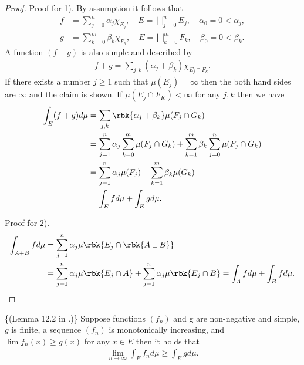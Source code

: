 \documentclass[openany, a4paper, oneside]{jsbook}
\begin{document}
\begin{proof}
Proof for 1).
By assumption it follows that
\begin{align}
  f
  &=
  \sum_{j=0}^n \alpha_j \chi_{E_j}, \quad
  E
  =
  \bigsqcup_{j=0}^{n} E_j, \quad
  \alpha_0 = 0 < \alpha_j, \\
  g
  &=
  \sum_{k=0}^m \beta_k \chi_{F_k}, \quad
  E
  =
  \bigsqcup_{k=0}^{m} F_k, \quad
  \beta_0 = 0 < \beta_k.
\end{align}
A function $(f+g)$ is also simple and described by
\begin{align}
  f + g
  =
  \sum_{j,k} (\alpha_j + \beta_k) \chi_{E_j \cap F_k}.
\end{align}
If there exists a number $j \geq 1$ such that $\mu (E_j) = \infty$ then
the both hand sides are $\infty$ and the claim is shown.
If $\mu (E_j \cap F_K) < \infty$ for any $j,k$ then we have
\begin{align}
 \int_E (f+g) d\mu
 &=
 \sum_{j,k} \rbk{\alpha_j + \beta_k} \mu (F_j \cap G_k) \\
 &=
 \sum_{j=1}^n \alpha_j \sum_{k=0}^m \mu (F_j \cap G_k) + \sum_{k=1}^m \beta_k \sum_{j=0}^n \mu (F_j \cap G_k) \\
 &=
 \sum_{j=1}^n \alpha_j \mu (F_j) + \sum_{k=1}^m \beta_k \mu (G_k) \\
 &=
 \int_E f d\mu + \int_E g d\mu.
\end{align}

Proof for 2).
\begin{align}
 \int_{A+B} f d \mu
 &=
 \sum_{j=1}^n \alpha_j \mu \rbk{E_j \cap \rbk{A \sqcup B}} \\
 &=
 \sum_{j=1}^n \alpha_j \mu \rbk{E_j \cap A} + \sum_{j=1}^n \alpha_j \mu \rbk{E_j \cap B}
 =
 \int_A f d\mu + \int_B f d\mu.
\end{align}
\end{proof}
\begin{lem}\textup\{(Lemma 12.2 in \cite{SeizoIto1}.)\}
 Suppose functions $(f_n)$ and g are non-negative and simple, $g$ is finite, a sequence $(f_n)$ is monotonically increasing, and
 $\lim f_n (x) \geq g (x)$ for any $x \in E$ then it holds that
\begin{align}
 \lim_{n \to \infty} \int_E f_n d \mu
 \geq
 \int_E g d\mu.
\end{align}
\end{lem}
\end{document}
